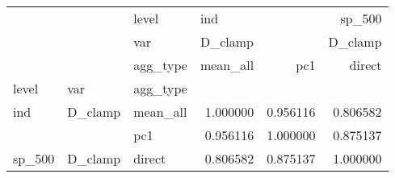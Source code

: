 \begin{tabular}{lllrrr}
\toprule
       &         & level & \multicolumn{2}{l}{ind} &    sp\_500 \\
       &         & var & \multicolumn{2}{l}{D\_clamp} &   D\_clamp \\
       &         & agg\_type &  mean\_all &       pc1 &    direct \\
level & var & agg\_type &           &           &           \\
\midrule
ind & D\_clamp & mean\_all &  1.000000 &  0.956116 &  0.806582 \\
       &         & pc1 &  0.956116 &  1.000000 &  0.875137 \\
sp\_500 & D\_clamp & direct &  0.806582 &  0.875137 &  1.000000 \\
\bottomrule
\end{tabular}
